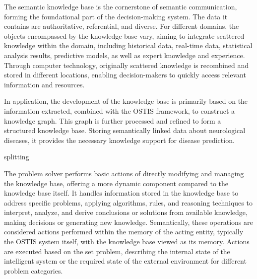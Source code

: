 \documentclass{scndocument}
\begin{document}
\begin{multicols*}{2}
The semantic knowledge base is the cornerstone of semantic communication, forming the foundational part of the decision-making system. The data it contains are authoritative, referential, and diverse. For different domains, the objects encompassed by the knowledge base vary, aiming to integrate scattered knowledge within the domain, including historical data, real-time data, statistical analysis results, predictive models, as well as expert knowledge and experience. Through computer technology, originally scattered knowledge is recombined and stored in different locations, enabling decision-makers to quickly access relevant information and resources.

In application, the development of the knowledge base is primarily based on the information extracted, combined with the OSTIS framework, to construct a knowledge graph. This graph is further processed and refined to form a structured knowledge base. Storing semantically linked data about neurological diseases, it provides the necessary knowledge support for disease prediction.
\begin{SCn}
\begin{scnindent}
\end{scnindent}
\begin{scnindent}
    \begin{scnindent}
        \begin{scnrelfromset}{splitting}
        \end{scnrelfromset}
    \end{scnindent}
    \begin{scnindent}
    \end{scnindent}
    \begin{scnindent}
    \end{scnindent}
\end{scnindent}
\end{SCn}

The problem solver performs basic actions of directly modifying and managing the knowledge base, offering a more dynamic component compared to the knowledge base itself. It handles information stored in the knowledge base to address specific problems, applying algorithms, rules, and reasoning techniques to interpret, analyze, and derive conclusions or solutions from available knowledge, making decisions or generating new knowledge. Semantically, these operations are considered actions performed within the memory of the acting entity, typically the OSTIS system itself, with the knowledge base viewed as its memory. Actions are executed based on the set problem, describing the internal state of the intelligent system or the required state of the external environment for different problem categories.


\end{multicols*}
\end{document}

